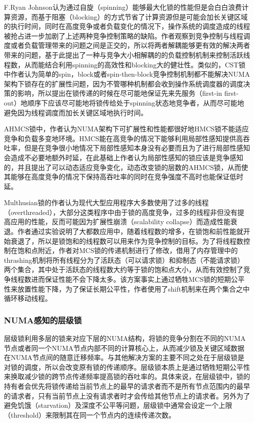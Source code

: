 F.Ryan Johnson\cite{johnson2010decoupling}认为通过自旋（spinning）能够最大化锁的性能但是会白白浪费计算资源，而基于阻塞（blocking）的方式节省了计算资源但是可能会加长关键区域的执行时间，同时在高度竞争或者负载变化的情况下，操作系统的调度造成的线程被抢占进一步加剧了上述两种竞争控制策略的缺陷。作者观察到竞争控制与线程调度或者负载管理带来的问题之间是正交的，所以将两者解耦能够更有效的解决两者带来的问题，基于此提出了一种与竞争大小相解耦的的负载控制机制来控制活跃线程数，从而能结合利用spinning的高效性和blocking大的健壮性。类似的，CST锁\cite{kashyap2017scalable}中作者认为简单的spin，block或者spin-then-block竞争控制机制都不能解决NUMA架构下锁存在的扩展性问题，因为不管哪种机制都会收到操作系统调度器的调度决策的影响，所以提出在锁传递的时候在尽可能地保证先来先服务（first-in first-out）地顺序下应该尽可能地将锁传给处于spinning状态地竞争者，从而尽可能地避免因为线程调度而加长关键区域地执行时间。

AHMCS\cite{chabbi2016contention}锁中，作者认为NUMA架构下可扩展性和性能都很好地HMCS\cite{chabbi2015high}锁不能适应竞争和负载多变地环境。HMCS能在高竞争的情况下能够利用局部性感知提供高吞吐率，但是在竞争很小地情况下局部性感知本身没有必要而且为了进行局部性感知会造成不必要地额外时延，在此基础上作者认为局部性感知的锁应该是竞争感知的，并且提出了可以动态适应竞争变化，动态改变锁的层数的AHMCS锁，从而使其能够在高度竞争的情况下保持高吞吐率的同时在竞争强度不高时也能保证低时延。

Multhusian锁\cite{dice2017malthusian}的作者认为现代大型应用程序大多数使用了过多的线程（overthreaded），大部分这类程序中由于锁的高度竞争，过多的线程非但没有提高应用的性能，反而可能因为扩展性崩溃（scalability collapse）而造成性能衰退。作者通过实验说明了大都数应用中，随着线程数的增多，在锁饱和前性能就开始衰退了，所以是锁饱和的线程数可以用来作为竞争控制的目标。为了将线程数控制在饱和点附近，作者对MCS锁的传递机制进行了修改，借用了内存管理中的thrashing机制\cite{denning1980working}将所有线程分为了活跃态（可以请求锁）和抑制态（不能请求锁）两个集合，其中处于活跃态的线程数大约等于锁的饱和点大小，从而有效控制了竞争线程数进而保证性能不会下降太多。该方案事实上通过牺牲MCS锁的短期公平性来放置性能下降，为了保证长期公平性，作者使用了shift机制来在两个集合之中循环移动线程。


\subsubsection{NUMA感知的层级锁}
层级锁利用多层的锁来对应下层的NUMA结构，将锁的竞争分割在不同的NUMA节点或者同一个NUMA节点内部不同的计算核心上，从而减少锁及关键区域数据在NUMA节点间的随意迁移频率\cite{dice2012lock}。与其他解决方案的主要不同之处在于层级锁是对锁的调度，所以会改变原有锁的传递顺序。层级锁本质上是通过牺牲短期公平性来换取减少锁的跨节点传递频率提高锁的吞吐率的。具体来说，在层级锁中，锁的持有者会优先将锁传递给当前节点上的最早的请求者而不是所有节点范围内的最早的请求者，只有当前节点上没有请求者时才会传给其他节点上的请求者。另外为了避免饥饿（starvation）及深度不公平等问题，层级锁中通常会设定一个上限（threshold）来限制其在同一个节点内的连续传递次数。


